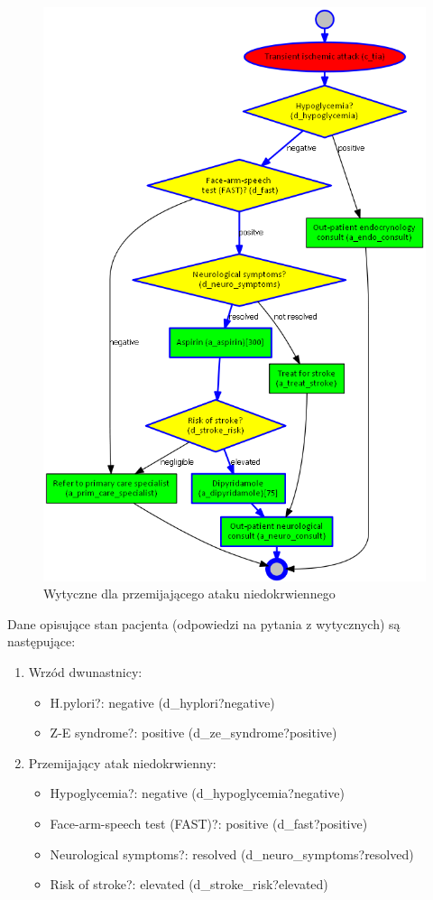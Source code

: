 \begin{figure}[H]
\centering
\includegraphics[scale=0.45]{img/tia.png}
\caption{Wytyczne dla przemijającego ataku niedokrwiennego}
\label{fig:tia}
\end{figure}
Dane opisujące stan pacjenta (odpowiedzi na pytania z wytycznych) są następujące:
\begin{enumerate}
\item{Wrzód dwunastnicy:
	\begin{itemize}
	\item{H.pylori?: negative (d\_hyplori?negative)}
	\item{Z-E syndrome?: positive (d\_ze\_syndrome?positive)}
	\end{itemize}
}
\item{Przemijający atak niedokrwienny:
	\begin{itemize}
	\item{Hypoglycemia?: negative (d\_hypoglycemia?negative)}
	\item{Face-arm-speech test (FAST)?: positive (d\_fast?positive)}
	\item{Neurological symptoms?: resolved (d\_neuro\_symptoms?resolved)}
	\item{Risk of stroke?: elevated (d\_stroke\_risk?elevated)}
	\end{itemize}
}
\end{enumerate}
